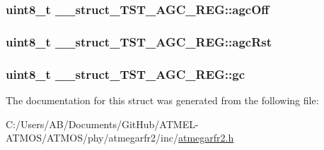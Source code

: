 \hypertarget{struct____struct___t_s_t___a_g_c___r_e_g_abdac0f232ebbc45fd79137819756111a}{
\subsubsection[{agc\-Off}]{\setlength{\rightskip}{0pt plus 5cm}uint8\-\_\-t \-\_\-\-\_\-struct\-\_\-\-T\-S\-T\-\_\-\-A\-G\-C\-\_\-\-R\-E\-G\-::agc\-Off}}\label{struct____struct___t_s_t___a_g_c___r_e_g_abdac0f232ebbc45fd79137819756111a}
\hypertarget{struct____struct___t_s_t___a_g_c___r_e_g_a8c24b123f4c703a4c91ec94f09a02e8d}{
\subsubsection[{agc\-Rst}]{\setlength{\rightskip}{0pt plus 5cm}uint8\-\_\-t \-\_\-\-\_\-struct\-\_\-\-T\-S\-T\-\_\-\-A\-G\-C\-\_\-\-R\-E\-G\-::agc\-Rst}}\label{struct____struct___t_s_t___a_g_c___r_e_g_a8c24b123f4c703a4c91ec94f09a02e8d}
\hypertarget{struct____struct___t_s_t___a_g_c___r_e_g_a5e531dbf7f64d7fa00254021ef2d68ed}{
\subsubsection[{gc}]{\setlength{\rightskip}{0pt plus 5cm}uint8\-\_\-t \-\_\-\-\_\-struct\-\_\-\-T\-S\-T\-\_\-\-A\-G\-C\-\_\-\-R\-E\-G\-::gc}}\label{struct____struct___t_s_t___a_g_c___r_e_g_a5e531dbf7f64d7fa00254021ef2d68ed}


The documentation for this struct was generated from the following file\-:\begin{DoxyCompactItemize}
\item 
C\-:/\-Users/\-A\-B/\-Documents/\-Git\-Hub/\-A\-T\-M\-E\-L-\/\-A\-T\-M\-O\-S/\-A\-T\-M\-O\-S/phy/atmegarfr2/inc/\hyperlink{atmegarfr2_8h}{atmegarfr2.\-h}\end{DoxyCompactItemize}
